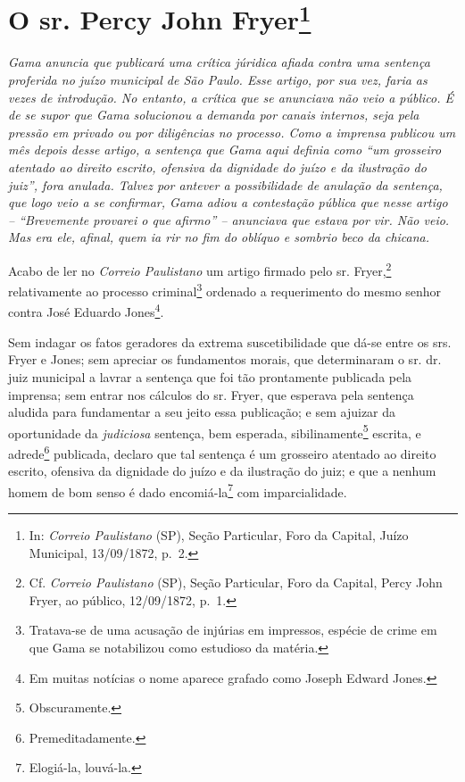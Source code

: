\chapter{O sr. Percy John Fryer\footnote{ In: \emph{Correio Paulistano} (SP), Seção Particular, Foro
  da Capital, Juízo Municipal, 13/09/1872, p.~2.}} %

\begin{didascalia}
\emph{Gama anuncia que publicará uma crítica júridica afiada contra uma
sentença proferida no juízo municipal de São Paulo. Esse artigo, por sua
vez, faria as vezes de introdução. No entanto, a crítica que se
anunciava não veio a público. É de se supor que Gama solucionou a
demanda por canais internos, seja pela pressão em privado ou por
diligências no processo. Como a imprensa publicou um mês depois desse
artigo, a sentença que Gama aqui definia como ``um grosseiro atentado ao
direito escrito, ofensiva da dignidade do juízo e da ilustração do
juiz'', fora anulada. Talvez por antever a possibilidade de anulação da
sentença, que logo veio a se confirmar, Gama adiou a contestação pública
que nesse artigo -- ``Brevemente provarei o que afirmo'' -- anunciava que
estava por vir. Não veio. Mas era ele, afinal, quem ia rir no fim do
oblíquo e sombrio beco da chicana.}
\end{didascalia}

\asterisc{}

Acabo de ler no \emph{Correio Paulistano} um artigo firmado pelo sr.
Fryer,\footnote{ Cf. \emph{Correio Paulistano} (SP), Seção Particular,
  Foro da Capital, Percy John Fryer, ao público, 12/09/1872, p.~1.}
relativamente ao processo criminal\footnote{ Tratava-se de uma acusação
  de injúrias em impressos, espécie de crime em que Gama se notabilizou
  como estudioso da matéria.} ordenado a requerimento do mesmo senhor
contra José Eduardo Jones\footnote{ Em muitas notícias o nome aparece
  grafado como Joseph Edward Jones.}.

Sem indagar os fatos geradores da extrema suscetibilidade que dá-se
entre os srs. Fryer e Jones; sem apreciar os fundamentos morais, que
determinaram o sr. dr. juiz municipal a lavrar a sentença que foi tão
prontamente publicada pela imprensa; sem entrar nos cálculos do sr.
Fryer, que esperava pela sentença aludida para fundamentar a seu jeito
essa publicação; e sem ajuizar da oportunidade da \emph{judiciosa}
sentença, bem esperada, sibilinamente\footnote{ Obscuramente.} escrita,
e adrede\footnote{ Premeditadamente.} publicada, declaro que tal
sentença é um grosseiro atentado ao direito escrito, ofensiva da
dignidade do juízo e da ilustração do juiz; e que a nenhum homem de bom
senso é dado encomiá-la\footnote{ Elogiá-la, louvá-la.} com
imparcialidade.

